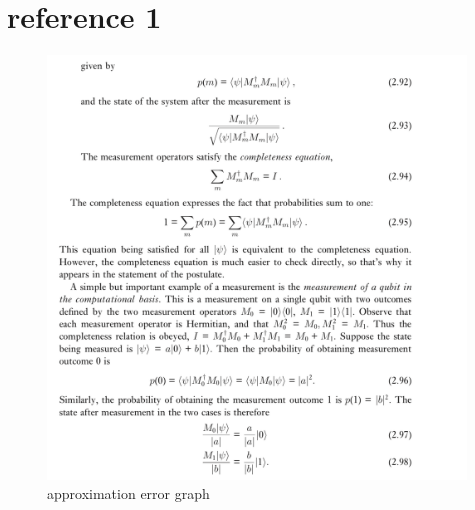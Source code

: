 \documentclass[a4paper, 11pt]{article} %
\begin{document}
\clearpage
\section*{reference 1}
\begin{figure}[h]
        \centering
        \includegraphics[width=0.99\textwidth]{2}
        \caption{approximation error graph}
\end{figure}
\end{document}
